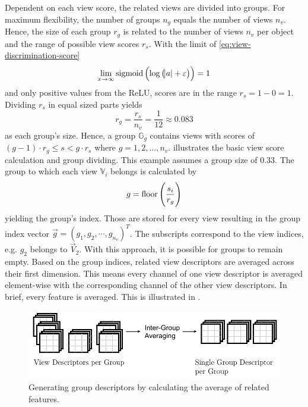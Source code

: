 Dependent on each view score, the related views are divided into groups.
For maximum flexibility, the number of groups $n_g$ equals the number of views $n_v$.
Hence, the size of each group $r_g$ is related to the number of views $n_v$ per object and the range of possible view scores $r_s$.
With the limit of \eqref{eq:view-discrimination-score}
\begin{equation}
	\lim_{x\rightarrow \infty} \operatorname{sigmoid}\left( \log \left( \abs{a} + \varepsilon \right) \right) = 1
\end{equation}
and only positive values from the ReLU, scores are in the range $r_s = 1 - 0 = 1$.
Dividing $r_s$ in equal sized parts yields
\begin{equation}
	r_g = \frac{r_s}{n_v} = \frac{1}{12} \approx 0.083
\end{equation}
as each group's size.
Hence, a group $\mathbb{G}_g$ contains views with scores of $(g-1) \cdot r_g \leq s < g \cdot r_s$ where $g = {1,2, \dots, n_v}$.
 illustrates the basic view score calculation and group dividing.
This example assumes a group size of $0.33$.
The group to which each view $\mathbb{V}_i$ belongs is calculated by
\begin{equation}
	g = \operatorname{floor} \left( \frac{s_i}{r_g} \right)
\end{equation}
yielding the group's index.
Those are stored for every view resulting in the group index vector $\vec{g} = \left( g_1, g_2, \cdots, g_{n_v}\right)^T$.
The subscripts correspond to the view indices, e.g. $g_2$ belongs to $\vec{V}_2$.
With this approach, it is possible for groups to remain empty.
Based on the group indices, related view descriptors are averaged across their first dimension.
This means every channel of one view descriptor is averaged element-wise with the corresponding channel of the other view descriptors.
In brief, every feature is averaged.
This is illustrated in .
\begin{figure}
	\centering
	\includegraphics[]{images/grouping_module_group_descriptors.pdf}
	\caption[Generating group descriptors]{Generating group descriptors by calculating the average of related features.}
	\label{fig:grouping-module-group-descriptors}
\end{figure}
